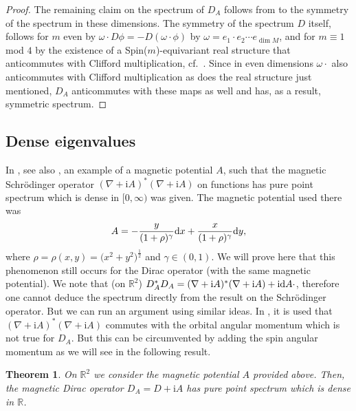\documentclass[pdftex]{sigma}
\numberwithin{equation}{section}
\newtheorem{Theorem}{Theorem}[section]
\begin{document}
\begin{proof}
The remaining claim on the spectrum of $D_A$ follows from to the symmetry of the spectrum in these dimensions. The symmetry of the spectrum $D$ itself, follows for $m$ even by $\omega \cdot D\phi =-D(\omega\cdot \phi)$ by $\omega= e_1\cdot e_2 \cdots   e_{\dim M}$, and for $m\equiv 1$ mod $4$ by the existence of a Spin($m$)-equivariant real structure that anticommutes with Clifford multiplication, cf.\ \cite[Proposition, p.~31]{Fr}. Since in even dimensions $\omega\cdot$ also anticommutes with Clifford multiplication as does the real structure just mentioned, $D_A$ anticommutes with these maps as well and has, as a result, symmetric spectrum.
\end{proof}

\subsection{Dense eigenvalues}
In \cite{MS}, see also \cite[Theorem~6.2]{CFKS}, an example of a magnetic potential $A$, such that the magnetic Schr\"odinger operator $(\nabla + {\mathrm{i}}A)^*(\nabla +{\mathrm{i}}A)$ on functions has pure point spectrum which is dense in $[0, \infty)$ was given. The magnetic potential used there was	
\[
A=-\frac{y}{(1+\rho)^\gamma} {\rm d}x+\frac{x}{(1+\rho)^\gamma} {\rm d}y,\]
 where $\rho=\rho(x,y)=\bigl(x^2+y^2\bigr)^\frac{1}{2}$ and $\gamma\in (0,1)$. We will prove here that this phenomenon still occurs for the Dirac operator (with the same magnetic potential). We note that \big(on ${\mathbb R}^2$\big) $D_A^*D_A =(\nabla + {\mathrm{i}}A)^*(\nabla +{\mathrm{i}}A) + {\mathrm{i}} {\rm d}A\cdot$, therefore one cannot deduce the spectrum directly from the result on the Schr\"odinger operator. But we can run an argument using similar ideas. In \cite[Theorem~6.2]{CFKS}, it is used that $(\nabla + {\mathrm{i}}A)^*(\nabla +{\mathrm{i}}A)$ commutes with the orbital angular momentum which is not true for $D_A$. But this can be circumvented by adding the spin angular momentum as we will see in the following result.

\begin{Theorem}\label{thm_dense} On $\mathbb R^2$ we consider the magnetic potential $A$ provided above.
Then, the magnetic Dirac operator $D_A= D+\mathrm{i}A$ has pure point spectrum which is dense in ${\mathbb R}$.
\end{Theorem}
\end{document}
